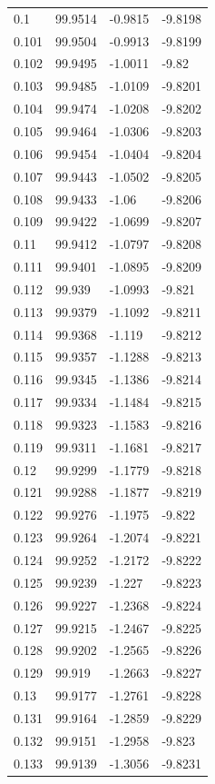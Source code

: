 \begin{tabular}{llll}
0.1 & 99.9514 & -0.9815 & -9.8198 \\
0.101 & 99.9504 & -0.9913 & -9.8199 \\
0.102 & 99.9495 & -1.0011 & -9.82 \\
0.103 & 99.9485 & -1.0109 & -9.8201 \\
0.104 & 99.9474 & -1.0208 & -9.8202 \\
0.105 & 99.9464 & -1.0306 & -9.8203 \\
0.106 & 99.9454 & -1.0404 & -9.8204 \\
0.107 & 99.9443 & -1.0502 & -9.8205 \\
0.108 & 99.9433 & -1.06 & -9.8206 \\
0.109 & 99.9422 & -1.0699 & -9.8207 \\
0.11 & 99.9412 & -1.0797 & -9.8208 \\
0.111 & 99.9401 & -1.0895 & -9.8209 \\
0.112 & 99.939 & -1.0993 & -9.821 \\
0.113 & 99.9379 & -1.1092 & -9.8211 \\
0.114 & 99.9368 & -1.119 & -9.8212 \\
0.115 & 99.9357 & -1.1288 & -9.8213 \\
0.116 & 99.9345 & -1.1386 & -9.8214 \\
0.117 & 99.9334 & -1.1484 & -9.8215 \\
0.118 & 99.9323 & -1.1583 & -9.8216 \\
0.119 & 99.9311 & -1.1681 & -9.8217 \\
0.12 & 99.9299 & -1.1779 & -9.8218 \\
0.121 & 99.9288 & -1.1877 & -9.8219 \\
0.122 & 99.9276 & -1.1975 & -9.822 \\
0.123 & 99.9264 & -1.2074 & -9.8221 \\
0.124 & 99.9252 & -1.2172 & -9.8222 \\
0.125 & 99.9239 & -1.227 & -9.8223 \\
0.126 & 99.9227 & -1.2368 & -9.8224 \\
0.127 & 99.9215 & -1.2467 & -9.8225 \\
0.128 & 99.9202 & -1.2565 & -9.8226 \\
0.129 & 99.919 & -1.2663 & -9.8227 \\
0.13 & 99.9177 & -1.2761 & -9.8228 \\
0.131 & 99.9164 & -1.2859 & -9.8229 \\
0.132 & 99.9151 & -1.2958 & -9.823 \\
0.133 & 99.9139 & -1.3056 & -9.8231 \\

\end{tabular}
